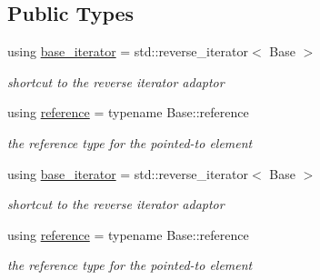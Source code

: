 \subsection*{Public Types}
\begin{DoxyCompactItemize}
\item 
using \hyperlink{classnlohmann_1_1basic__json_1_1json__reverse__iterator_a9ebc4c99e6fc90c965af0f39ad2ca70e}{base\-\_\-iterator} = std\-::reverse\-\_\-iterator$<$ Base $>$
\begin{DoxyCompactList}\small\item\em shortcut to the reverse iterator adaptor \end{DoxyCompactList}\item 
using \hyperlink{classnlohmann_1_1basic__json_1_1json__reverse__iterator_a7265535f39299824f9712a2ca15013c3}{reference} = typename Base\-::reference
\begin{DoxyCompactList}\small\item\em the reference type for the pointed-\/to element \end{DoxyCompactList}\item 
using \hyperlink{classnlohmann_1_1basic__json_1_1json__reverse__iterator_a9ebc4c99e6fc90c965af0f39ad2ca70e}{base\-\_\-iterator} = std\-::reverse\-\_\-iterator$<$ Base $>$
\begin{DoxyCompactList}\small\item\em shortcut to the reverse iterator adaptor \end{DoxyCompactList}\item 
using \hyperlink{classnlohmann_1_1basic__json_1_1json__reverse__iterator_a7265535f39299824f9712a2ca15013c3}{reference} = typename Base\-::reference
\begin{DoxyCompactList}\small\item\em the reference type for the pointed-\/to element \end{DoxyCompactList}\end{DoxyCompactItemize}
